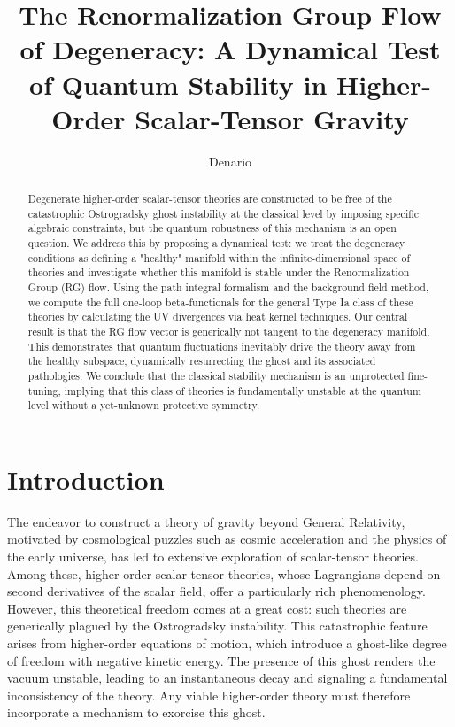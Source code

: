 \documentclass[twocolumn]{aastex631}
\begin{document}
\title{The Renormalization Group Flow of Degeneracy: A Dynamical Test of Quantum Stability in Higher-Order Scalar-Tensor Gravity}

\author{Denario}

\begin{abstract}
Degenerate higher-order scalar-tensor theories are constructed to be free of the catastrophic Ostrogradsky ghost instability at the classical level by imposing specific algebraic constraints, but the quantum robustness of this mechanism is an open question. We address this by proposing a dynamical test: we treat the degeneracy conditions as defining a "healthy" manifold within the infinite-dimensional space of theories and investigate whether this manifold is stable under the Renormalization Group (RG) flow. Using the path integral formalism and the background field method, we compute the full one-loop beta-functionals for the general Type Ia class of these theories by calculating the UV divergences via heat kernel techniques. Our central result is that the RG flow vector is generically not tangent to the degeneracy manifold. This demonstrates that quantum fluctuations inevitably drive the theory away from the healthy subspace, dynamically resurrecting the ghost and its associated pathologies. We conclude that the classical stability mechanism is an unprotected fine-tuning, implying that this class of theories is fundamentally unstable at the quantum level without a yet-unknown protective symmetry.
\end{abstract}



\section{Introduction}
\label{sec:intro}

The endeavor to construct a theory of gravity beyond General Relativity, motivated by cosmological puzzles such as cosmic acceleration and the physics of the early universe, has led to extensive exploration of scalar-tensor theories. Among these, higher-order scalar-tensor theories, whose Lagrangians depend on second derivatives of the scalar field, offer a particularly rich phenomenology. However, this theoretical freedom comes at a great cost: such theories are generically plagued by the Ostrogradsky instability. This catastrophic feature arises from higher-order equations of motion, which introduce a ghost-like degree of freedom with negative kinetic energy. The presence of this ghost renders the vacuum unstable, leading to an instantaneous decay and signaling a fundamental inconsistency of the theory. Any viable higher-order theory must therefore incorporate a mechanism to exorcise this ghost.
\end{document}

